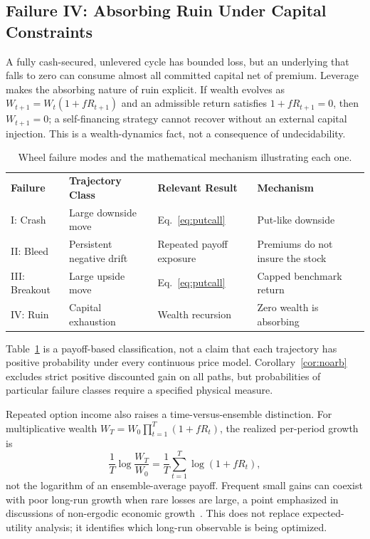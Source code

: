 \documentclass[aps,pra,reprint,superscriptaddress,amsmath,amssymb,floatfix]{revtex4-2}
\theoremstyle{plain}
\theoremstyle{definition}
\theoremstyle{remark}
\begin{document}
\subsection{Failure IV: Absorbing Ruin Under Capital Constraints}

A fully cash-secured, unlevered cycle has bounded loss, but an underlying that
falls to zero can consume almost all committed capital net of premium.
Leverage makes the absorbing nature of ruin explicit. If wealth evolves as
\(W_{t+1}=W_t(1+fR_{t+1})\) and an admissible return satisfies
\(1+fR_{t+1}=0\), then \(W_{t+1}=0\); a self-financing strategy cannot recover
without an external capital injection. This is a wealth-dynamics fact, not a
consequence of undecidability.

\begin{table}[ht]
\caption{\label{tab:failuremodes}Wheel failure modes and the mathematical mechanism illustrating each one.}
\begin{ruledtabular}
\begin{tabular*}{\textwidth}{@{\extracolsep{\fill}}llll}
\textbf{Failure} & \textbf{Trajectory Class} & \textbf{Relevant Result} & \textbf{Mechanism} \\
\colrule
I: Crash & Large downside move & Eq.~\eqref{eq:putcall} & Put-like downside \\
II: Bleed & Persistent negative drift & Repeated payoff exposure & Premiums do not insure the stock \\
III: Breakout & Large upside move & Eq.~\eqref{eq:putcall} & Capped benchmark return \\
IV: Ruin & Capital exhaustion & Wealth recursion & Zero wealth is absorbing \\
\end{tabular*}
\end{ruledtabular}
\end{table}

Table~\ref{tab:failuremodes} is a payoff-based classification, not a claim
that each trajectory has positive probability under every continuous price
model. Corollary~\ref{cor:noarb} excludes strict positive discounted gain on
all paths, but probabilities of particular failure classes require a specified
physical measure.

Repeated option income also raises a time-versus-ensemble distinction. For
multiplicative wealth \(W_T=W_0\prod_{t=1}^T(1+fR_t)\), the realized
per-period growth is
\[
  \frac1T\log\frac{W_T}{W_0}
  =\frac1T\sum_{t=1}^T\log(1+fR_t),
\]
not the logarithm of an ensemble-average payoff. Frequent small gains can
coexist with poor long-run growth when rare losses are large, a point emphasized
in discussions of non-ergodic economic growth~\cite{Peters2019}. This does not
replace expected-utility analysis; it identifies which long-run observable is
being optimized.
\end{document}
